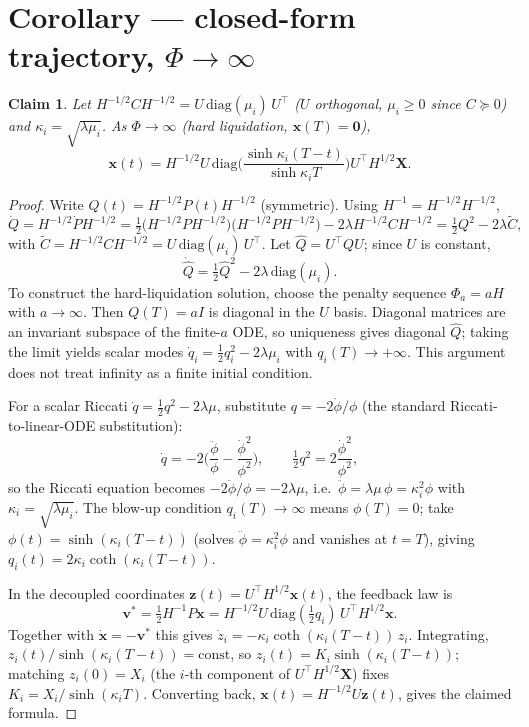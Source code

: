 \documentclass[11pt,a4paper]{article}
\newtheorem*{claim}{Claim}
\begin{document}
\section*{Corollary --- closed-form trajectory, $\Phi\to\infty$}

\begin{claim}
Let $H^{-1/2}CH^{-1/2}=U\,\mathrm{diag}(\mu_i)\,U^\top$ ($U$ orthogonal,
$\mu_i\ge0$ since $C\succeq0$) and $\kappa_i=\sqrt{\lambda\mu_i}$. As
$\Phi\to\infty$ (hard liquidation, $\mathbf x(T)=\mathbf 0$),
\[
\mathbf x(t)=H^{-1/2}U\,\mathrm{diag}\!\Big(\frac{\sinh\kappa_i(T-t)}
{\sinh\kappa_iT}\Big)U^\top H^{1/2}\mathbf X .
\]
\end{claim}

\begin{proof}
Write $Q(t)=H^{-1/2}P(t)H^{-1/2}$ (symmetric). Using $H^{-1}=H^{-1/2}H^{-1/2}$,
\[
\dot Q=H^{-1/2}\dot PH^{-1/2}=\tfrac12\big(H^{-1/2}PH^{-1/2}\big)
\big(H^{-1/2}PH^{-1/2}\big)-2\lambda H^{-1/2}CH^{-1/2}=\tfrac12Q^2-2\lambda
\tilde C,
\]
with $\tilde C=H^{-1/2}CH^{-1/2}=U\,\mathrm{diag}(\mu_i)\,U^\top$. Let
$\hat Q=U^\top QU$; since $U$ is constant,
\[
\dot{\hat Q}=\tfrac12\hat Q^2-2\lambda\,\mathrm{diag}(\mu_i).
\]
To construct the hard-liquidation solution, choose the penalty sequence
$\Phi_a=aH$ with $a\to\infty$. Then $Q(T)=aI$ is diagonal in the $U$
basis. Diagonal matrices are an invariant subspace of the finite-$a$ ODE,
so uniqueness gives diagonal $\hat Q$; taking the limit yields scalar
modes $\dot q_i=\tfrac12q_i^2-2\lambda\mu_i$ with $q_i(T)\to+\infty$.
This argument does not treat infinity as a finite initial condition.

For a scalar Riccati $\dot q=\tfrac12q^2-2\lambda\mu$, substitute
$q=-2\dot\phi/\phi$ (the standard Riccati-to-linear-ODE substitution):
\[
\dot q=-2\Big(\frac{\ddot\phi}{\phi}-\frac{\dot\phi^2}{\phi^2}\Big),\qquad
\tfrac12q^2=2\frac{\dot\phi^2}{\phi^2},
\]
so the Riccati equation becomes $-2\ddot\phi/\phi=-2\lambda\mu$, i.e.\
$\ddot\phi=\lambda\mu\,\phi=\kappa_i^2\phi$ with $\kappa_i=\sqrt{\lambda\mu_i}$.
The blow-up condition $q_i(T)\to\infty$ means $\phi(T)=0$; take
$\phi(t)=\sinh(\kappa_i(T-t))$ (solves $\ddot\phi=\kappa_i^2\phi$ and
vanishes at $t=T$), giving $q_i(t)=2\kappa_i\coth(\kappa_i(T-t))$.

In the decoupled coordinates $\mathbf z(t)=U^\top H^{1/2}\mathbf x(t)$, the
feedback law is
\[
\mathbf v^*=\tfrac12H^{-1}P\mathbf x
=H^{-1/2}U\,\mathrm{diag}(\tfrac12q_i)\,U^\top H^{1/2}\mathbf x.
\]
Together with $\dot{\mathbf x}=-\mathbf v^*$ this gives $\dot z_i=-\kappa_i\coth(\kappa_i(T-t))\,z_i$. Integrating,
$z_i(t)/\sinh(\kappa_i(T-t))=\text{const}$, so $z_i(t)=K_i\sinh(\kappa_i
(T-t))$; matching $z_i(0)=X_i$ (the $i$-th component of $U^\top
H^{1/2}\mathbf X$) fixes $K_i=X_i/\sinh(\kappa_iT)$. Converting back,
$\mathbf x(t)=H^{-1/2}U\mathbf z(t)$, gives the claimed formula.
\end{proof}
\end{document}
